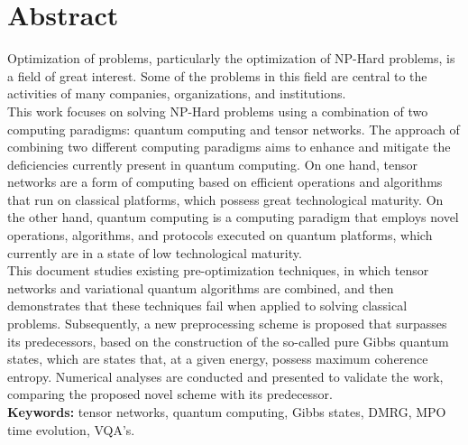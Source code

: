 \chapter{Abstract}

Optimization of problems, particularly the optimization of NP-Hard problems, is a field of great interest. Some of the problems in this field are central to the activities of many companies, organizations, and institutions. \\

This work focuses on solving NP-Hard problems using a combination of two computing paradigms: quantum computing and tensor networks. The approach of combining two different computing paradigms aims to enhance and mitigate the deficiencies currently present in quantum computing. On one hand, tensor networks are a form of computing based on efficient operations and algorithms that run on classical platforms, which possess great technological maturity. On the other hand, quantum computing is a computing paradigm that employs novel operations, algorithms, and protocols executed on quantum platforms, which currently are in a state of low technological maturity. \\

This document studies existing pre-optimization techniques, in which tensor networks and variational quantum algorithms are combined, and then demonstrates that these techniques fail when applied to solving classical problems. Subsequently, a new preprocessing scheme is proposed that surpasses its predecessors, based on the construction of the so-called pure Gibbs quantum states, which are states that, at a given energy, possess maximum coherence entropy. Numerical analyses are conducted and presented to validate the work, comparing the proposed novel scheme with its predecessor. \\



{\bf Keywords:} tensor networks, quantum computing, Gibbs states, DMRG, MPO time evolution, VQA's.